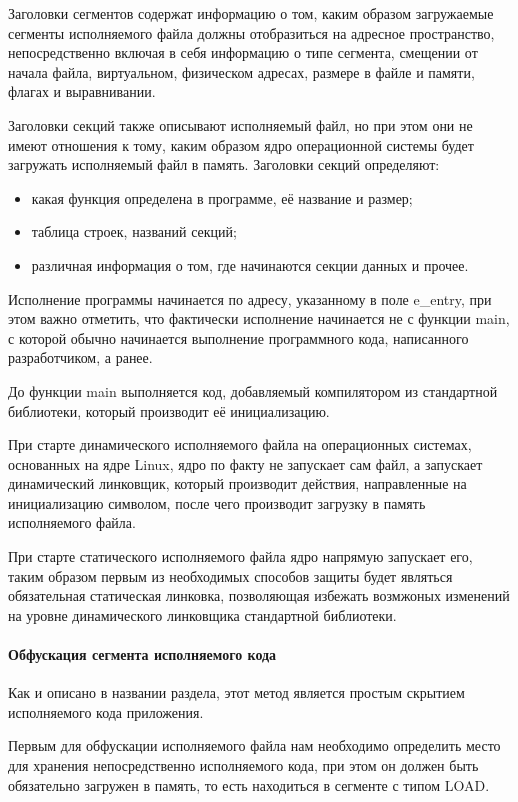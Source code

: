 \documentclass{gost7.32-2001}
\begin{document}
Заголовки сегментов содержат информацию о том, каким образом
загружаемые сегменты исполняемого файла должны отобразиться на
адресное пространство, непосредственно включая в себя информацию о
типе сегмента, смещении от начала файла, виртуальном, физическом
адресах, размере в файле и памяти, флагах и выравнивании.

Заголовки секций также описывают исполняемый файл, но при этом они не
имеют отношения к тому, каким образом ядро операционной системы будет
загружать исполняемый файл в память. Заголовки секций определяют:

\begin{itemize}
\item
  какая функция определена в программе, её название и размер;
\item
  таблица строек, названий секций;
\item
  различная информация о том, где начинаются секции данных и прочее.
\end{itemize}

Исполнение программы начинается по адресу, указанному в поле e\_entry,
при этом важно отметить, что фактически исполнение начинается не с
функции main, с которой обычно начинается выполнение программного
кода, написанного разработчиком, а ранее.

До функции main выполняется код, добавляемый компилятором из
стандартной библиотеки, который производит её инициализацию.

При старте динамического исполняемого файла на операционных системах,
основанных на ядре Linux, ядро по факту не запускает сам файл, а
запускает динамический линковщик, который производит действия,
направленные на инициализацию символом, после чего производит загрузку
в память исполняемого файла.

При старте статического исполняемого файла ядро напрямую запускает
его, таким образом первым из необходимых способов защиты будет
являться обязательная статическая линковка, позволяющая избежать
возмжоных изменений на уровне динамического линковщика стандартной
библиотеки.

\paragraph{Обфускация сегмента исполняемого кода}
Как и описано в названии раздела, этот метод является простым скрытием
исполняемого кода приложения.

Первым для обфускации исполняемого файла нам необходимо определить
место для хранения непосредственно исполняемого кода, при этом он
должен быть обязательно загружен в память, то есть находиться в
сегменте с типом LOAD.
\end{document}
